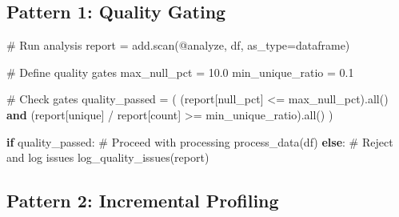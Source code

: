 \documentclass[
  letterpaper,
]{scrbook}
\newenvironment{Shaded}{\begin{snugshade}}{\end{snugshade}}
\newcommand{\BuiltInTok}[1]{\textcolor[rgb]{0.00,0.23,0.31}{#1}}
\newcommand{\CommentTok}[1]{\textcolor[rgb]{0.37,0.37,0.37}{#1}}
\newcommand{\ControlFlowTok}[1]{\textcolor[rgb]{0.00,0.23,0.31}{\textbf{#1}}}
\newcommand{\FloatTok}[1]{\textcolor[rgb]{0.68,0.00,0.00}{#1}}
\newcommand{\KeywordTok}[1]{\textcolor[rgb]{0.00,0.23,0.31}{\textbf{#1}}}
\newcommand{\NormalTok}[1]{\textcolor[rgb]{0.00,0.23,0.31}{#1}}
\newcommand{\OperatorTok}[1]{\textcolor[rgb]{0.37,0.37,0.37}{#1}}
\newcommand{\StringTok}[1]{\textcolor[rgb]{0.13,0.47,0.30}{#1}}
\begin{document}
\subsection{Pattern 1: Quality Gating}\label{pattern-1-quality-gating}

\begin{Shaded}
\begin{Highlighting}[]
\CommentTok{\# Run analysis}
\NormalTok{report }\OperatorTok{=}\NormalTok{ add.scan(}\StringTok{\textquotesingle{}@analyze\textquotesingle{}}\NormalTok{, df, as\_type}\OperatorTok{=}\StringTok{\textquotesingle{}dataframe\textquotesingle{}}\NormalTok{)}

\CommentTok{\# Define quality gates}
\NormalTok{max\_null\_pct }\OperatorTok{=} \FloatTok{10.0}
\NormalTok{min\_unique\_ratio }\OperatorTok{=} \FloatTok{0.1}

\CommentTok{\# Check gates}
\NormalTok{quality\_passed }\OperatorTok{=}\NormalTok{ (}
\NormalTok{    (report[}\StringTok{\textquotesingle{}null\_pct\textquotesingle{}}\NormalTok{] }\OperatorTok{\textless{}=}\NormalTok{ max\_null\_pct).}\BuiltInTok{all}\NormalTok{() }\KeywordTok{and}
\NormalTok{    (report[}\StringTok{\textquotesingle{}unique\textquotesingle{}}\NormalTok{] }\OperatorTok{/}\NormalTok{ report[}\StringTok{\textquotesingle{}count\textquotesingle{}}\NormalTok{] }\OperatorTok{\textgreater{}=}\NormalTok{ min\_unique\_ratio).}\BuiltInTok{all}\NormalTok{()}
\NormalTok{)}

\ControlFlowTok{if}\NormalTok{ quality\_passed:}
    \CommentTok{\# Proceed with processing}
\NormalTok{    process\_data(df)}
\ControlFlowTok{else}\NormalTok{:}
    \CommentTok{\# Reject and log issues}
\NormalTok{    log\_quality\_issues(report)}
\end{Highlighting}
\end{Shaded}

\subsection{Pattern 2: Incremental
Profiling}\label{pattern-2-incremental-profiling}
\end{document}
